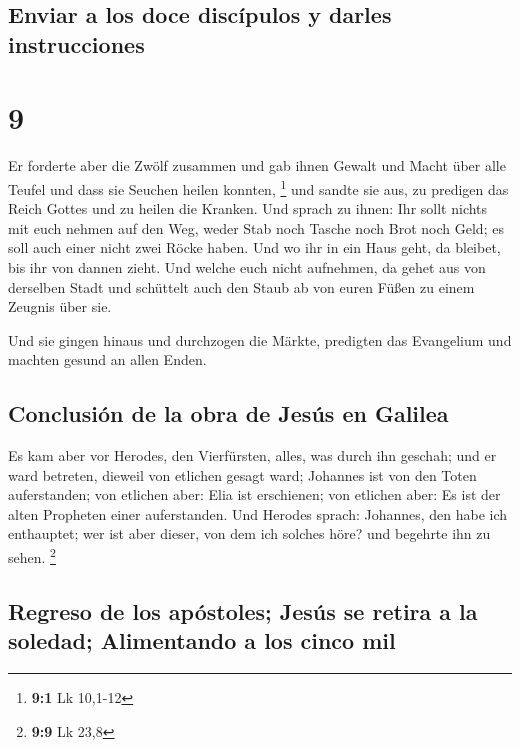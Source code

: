 \hypertarget{enviar-a-los-doce-discuxedpulos-y-darles-instrucciones}{%
\subsection{Enviar a los doce discípulos y darles
instrucciones}\label{enviar-a-los-doce-discuxedpulos-y-darles-instrucciones}}

\hypertarget{section-8}{%
\section{9}\label{section-8}}

 Er forderte aber die Zwölf zusammen und gab ihnen Gewalt
und Macht über alle Teufel und dass sie Seuchen heilen konnten,
\footnote{\textbf{9:1} Lk 10,1-12}  und sandte sie aus, zu
predigen das Reich Gottes und zu heilen die Kranken.  Und
sprach zu ihnen: Ihr sollt nichts mit euch nehmen auf den Weg, weder
Stab noch Tasche noch Brot noch Geld; es soll auch einer nicht zwei
Röcke haben.  Und wo ihr in ein Haus geht, da bleibet, bis
ihr von dannen zieht.  Und welche euch nicht aufnehmen, da
gehet aus von derselben Stadt und schüttelt auch den Staub ab von euren
Füßen zu einem Zeugnis über sie.

 Und sie gingen hinaus und durchzogen die Märkte,
predigten das Evangelium und machten gesund an allen Enden.

\hypertarget{conclusiuxf3n-de-la-obra-de-jesuxfas-en-galilea}{%
\subsection{Conclusión de la obra de Jesús en
Galilea}\label{conclusiuxf3n-de-la-obra-de-jesuxfas-en-galilea}}

 Es kam aber vor Herodes, den Vierfürsten, alles, was
durch ihn geschah; und er ward betreten, dieweil von etlichen gesagt
ward; Johannes ist von den Toten auferstanden;  von
etlichen aber: Elia ist erschienen; von etlichen aber: Es ist der alten
Propheten einer auferstanden.  Und Herodes sprach:
Johannes, den habe ich enthauptet; wer ist aber dieser, von dem ich
solches höre? und begehrte ihn zu sehen. \footnote{\textbf{9:9} Lk 23,8}

\hypertarget{regreso-de-los-apuxf3stoles-jesuxfas-se-retira-a-la-soledad-alimentando-a-los-cinco-mil}{%
\subsection{Regreso de los apóstoles; Jesús se retira a la soledad;
Alimentando a los cinco
mil}\label{regreso-de-los-apuxf3stoles-jesuxfas-se-retira-a-la-soledad-alimentando-a-los-cinco-mil}}

